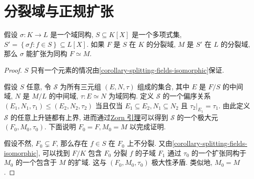 \section{分裂域与正规扩张}

\begin{proposition}
  \label{proposition-isomorphism-extend-to-splitting-fields}
  假设 \( \sigma: K \to L \) 是一个域同构, \( S \subseteq K[X] \)
  是一个多项式集, \( S' = \left\lbrace \sigma f: f \in S \right\rbrace \subseteq
  L[X] \).
  如果 \( F \) 是 \( S \) 在 \( K \) 的分裂域, \( M \) 是 \( S' \) 在 \( L \)
  的分裂域, 那么 \( \sigma \) 能扩张为同构 \( F \simeq M \).
\end{proposition}
\begin{proof}
  \( S \) 只有一个元素的情况由\cref{corollary-splitting-fields-isomorphic}保证.

  假设 \( S \) 任意, 令 \( \mathcal{S} \) 为所有三元组 \( (E, N, \tau) \)
  组成的集合, 其中 \( E \) 是 \( F/S \) 的中间域, \( N \) 是 \( M/L \) 的中间域,
  \( \tau: E \simeq N \) 为域同构.
  定义 \( \mathcal{S} \) 的一个偏序关系 \( (E_1, N_1, \tau_1) \leq (E_2, N_2,
  \tau_2) \) 当且仅当 \( E_1 \subseteq E_2, N_1 \subseteq N_2 \) 且 \( \left.
  \tau_2 \right\vert_{E_1} = \tau_1 \).
  由此定义 \( \mathcal{S} \) 的任意上升链都有上界,
  进而通过\href{https://en.wikipedia.org/wiki/Zorn's_lemma}{Zorn 引理}可以得到
  \( \mathcal{S} \) 的一个极大元 \( (F_0, M_0, \tau_0) \).
  下面说明 \( F_0 = F, M_0 = M \) 以完成证明.

  假设不然, \( F_0 \subsetneq F \), 那么存在 \( f \in S \) 在 \( F_0 \)
  上不分裂. 又由\cref{corollary-splitting-fields-isomorphic}, 可以找到 \( F/K \)
  包含 \( F_0 \) 分裂 \( f \) 的子域 \( F_1 \) 通过 \( \tau_0 \) 的一个扩张同构于
  \( M_0 \) 的一个包含于 \( M \) 的扩域.
  这与 \( (F_0, M_0, \tau_0) \) 极大性矛盾.
  类似地, \( M_0 = M \).
\end{proof}

